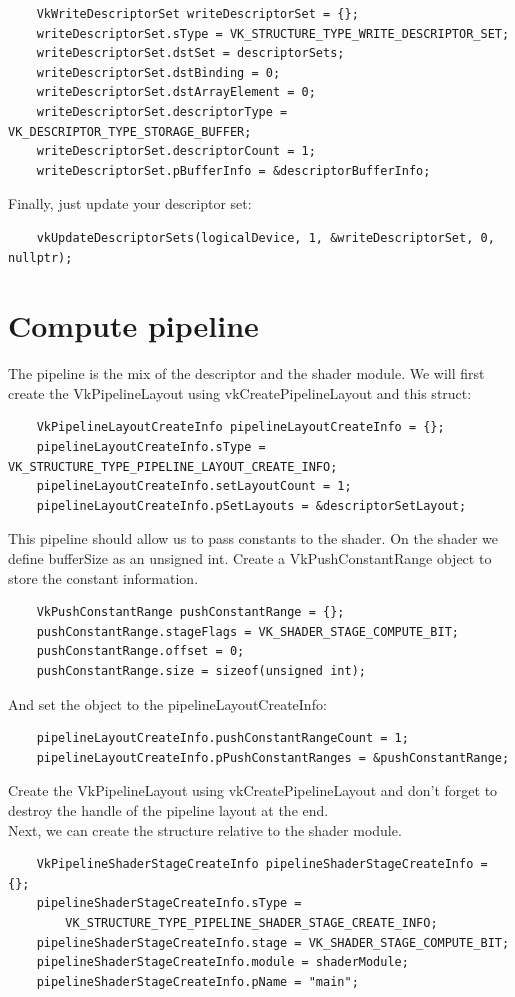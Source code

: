 \documentclass{article}
\begin{document}
\begin{lstlisting}
	VkWriteDescriptorSet writeDescriptorSet = {};
	writeDescriptorSet.sType = VK_STRUCTURE_TYPE_WRITE_DESCRIPTOR_SET;
	writeDescriptorSet.dstSet = descriptorSets;
	writeDescriptorSet.dstBinding = 0;
	writeDescriptorSet.dstArrayElement = 0;
	writeDescriptorSet.descriptorType = VK_DESCRIPTOR_TYPE_STORAGE_BUFFER;
	writeDescriptorSet.descriptorCount = 1;
	writeDescriptorSet.pBufferInfo = &descriptorBufferInfo;
\end{lstlisting}
Finally, just update your descriptor set:
\begin{lstlisting}
	vkUpdateDescriptorSets(logicalDevice, 1, &writeDescriptorSet, 0, nullptr);
\end{lstlisting}

\section{Compute pipeline}
The pipeline is the mix of the descriptor and the shader module. We will first create the VkPipelineLayout using vkCreatePipelineLayout and this struct:
\begin{lstlisting}
	VkPipelineLayoutCreateInfo pipelineLayoutCreateInfo = {};
	pipelineLayoutCreateInfo.sType = VK_STRUCTURE_TYPE_PIPELINE_LAYOUT_CREATE_INFO;
	pipelineLayoutCreateInfo.setLayoutCount = 1;
	pipelineLayoutCreateInfo.pSetLayouts = &descriptorSetLayout;
\end{lstlisting}
This pipeline should allow us to pass constants to the shader. On the shader we define bufferSize as an unsigned int. Create a VkPushConstantRange object to store the constant information.
\begin{lstlisting}
	VkPushConstantRange pushConstantRange = {};
	pushConstantRange.stageFlags = VK_SHADER_STAGE_COMPUTE_BIT;
	pushConstantRange.offset = 0;
	pushConstantRange.size = sizeof(unsigned int);
\end{lstlisting}
And set the object to the pipelineLayoutCreateInfo:
\begin{lstlisting}
	pipelineLayoutCreateInfo.pushConstantRangeCount = 1;
	pipelineLayoutCreateInfo.pPushConstantRanges = &pushConstantRange;
\end{lstlisting}
Create the VkPipelineLayout using vkCreatePipelineLayout and don't forget to destroy the handle of the pipeline layout at the end.\\
Next, we can create the structure relative to the shader module.
\begin{lstlisting}
	VkPipelineShaderStageCreateInfo pipelineShaderStageCreateInfo = {};
	pipelineShaderStageCreateInfo.sType =
		VK_STRUCTURE_TYPE_PIPELINE_SHADER_STAGE_CREATE_INFO;
	pipelineShaderStageCreateInfo.stage = VK_SHADER_STAGE_COMPUTE_BIT;
	pipelineShaderStageCreateInfo.module = shaderModule;
	pipelineShaderStageCreateInfo.pName = "main";
\end{lstlisting}
\end{document}
